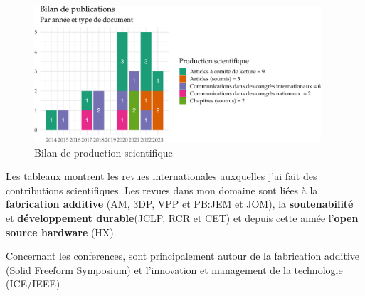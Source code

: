 \documentclass[
  11pt,
]{article}
\begin{document}
\begin{figure}[H]

{\centering \includegraphics[width=0.95\textwidth,height=\textheight]{Figures/fig-bilan-1.pdf}

}

\caption{\label{fig-bilan}Bilan de production scientifique}

\end{figure}

Les tableaux montrent les revues internationales auxquelles j'ai fait
des contributions scientifiques. Les revues dans mon domaine sont liées
à la \textbf{fabrication additive} (AM, 3DP, VPP et PB:JEM et JOM), la
\textbf{soutenabilité} et \textbf{développement durable}(JCLP, RCR et
CET) et depuis cette année l'\textbf{open source hardware} (HX).

Concernant les conferences, sont principalement autour de la fabrication
additive (Solid Freeform Symposium) et l'innovation et management de la
technologie (ICE/IEEE)
\end{document}
